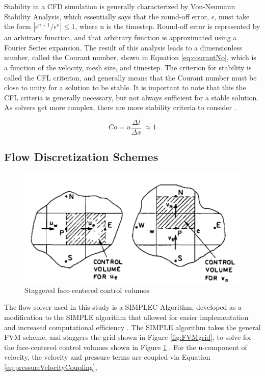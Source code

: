 \documentclass{UCF_ETD}
\begin{document}
Stability in a CFD simulation is generally characterized by Von-Neumann Stability Analysis, which essentially says that the round-off error, $\epsilon$, must take the form $|\epsilon^{n+1} / \epsilon^{n}| \leq 1$, where n is the timestep.  Round-off error is represented by an arbitrary function, and that arbitrary function is approximated using a Fourier Series expansion. The result of this analysis leads to a dimensionless number, called the Courant number, shown in Equation \ref{eq:courantNo}, which is a function of the velocity, mesh size, and timestep. The criterion for stability is called the CFL criterion, and generally means that the Courant number must be close to unity for a solution to be stable. It is important to note that this the CFL criteria is generally necessary, but not always sufficient for a stable solution. As solvers get more complex, there are more stability criteria to consider \cite{Anderson1995}.

\begin{equation}
    Co=u\frac{\Delta t}{\Delta x}\ \approx 1
    \label{eq:courantNo}
\end{equation}

\subsection{Flow Discretization Schemes}
\begin{figure}
    \centering
    \includegraphics{Figures/faceCenteredCVs.png}
    \caption{Staggered face-centered control volumes}
    \label{fig:faceCenterCVs}
\end{figure}

The flow solver used in this study is a SIMPLEC Algorithm, developed as a modification to the SIMPLE algorithm that allowed for easier implementation and increased computational efficiency \cite{SIMPLEC}. The SIMPLE algorithm takes the general FVM scheme, and staggers the grid shown in Figure \ref{fig:FVMgrid}, to solve for the face-centered control volumes shown in Figure \ref{fig:faceCenterCVs} \cite{Patankar1972ACP}. For the u-component of velocity, the velocity and pressure terms are coupled via Equation \ref{eq:pressureVelocityCoupling},
\end{document}
